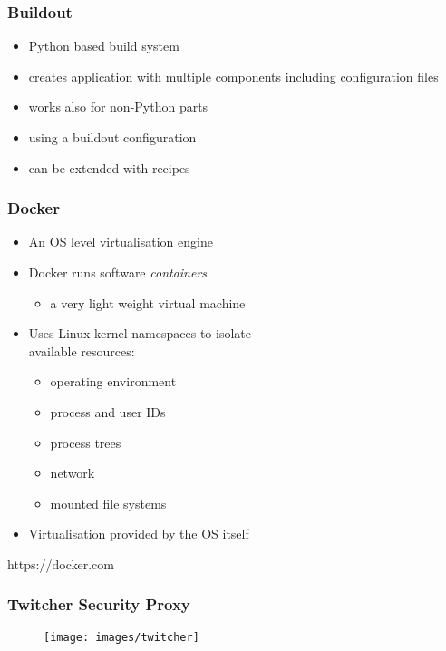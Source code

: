 \documentclass{beamer}
\begin{document}
\begin{frame}
  \frametitle<presentation>{Buildout}
  \begin{itemize}
    \item Python based build system
    \item creates application with multiple components including configuration files
    \item works also for non-Python parts
    \item using a buildout configuration
    \item can be extended with recipes
  \end{itemize}
\end{frame}

\begin{frame}
\frametitle<presentation>{Docker}


\begin{itemize}
  \item An OS level virtualisation engine
  \item Docker runs software \textit{containers}
  \begin{itemize} \item a very light weight virtual machine \end{itemize}
  \item Uses Linux kernel namespaces to isolate\\ available resources:
  \begin{itemize}
    \item operating environment
    \item process and user IDs
    \item process trees
    \item network
	\item mounted file systems
  \end{itemize}
  \item Virtualisation provided by the OS itself
\end{itemize}

\centering
\footnotesize{https://docker.com}

\end{frame}

\begin{frame}
\frametitle<presentation>{Twitcher Security Proxy}

  \begin{figure}[ht]
    \centering
    \texttt{[image: images/twitcher]}
  \end{figure}

\end{frame}
\end{document}
